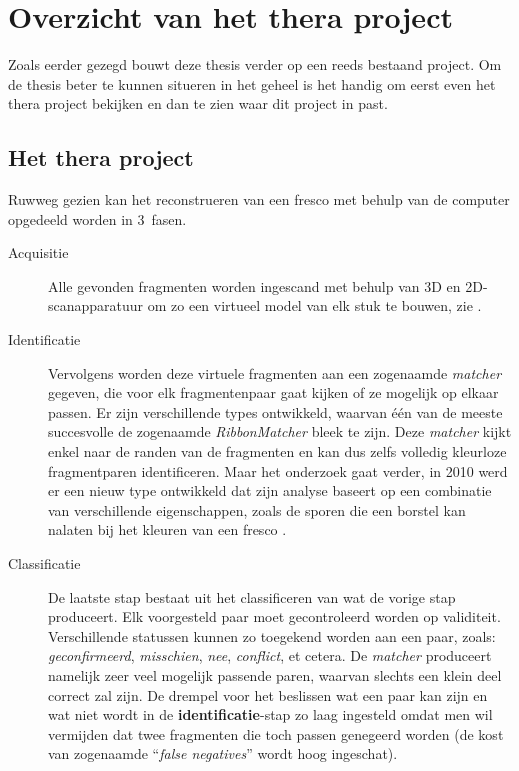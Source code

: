 \chapter{Overzicht van het thera project}
\label{hoofdstuk:overzicht}
Zoals eerder gezegd bouwt deze thesis verder op een reeds bestaand project. Om de thesis beter te kunnen situeren in het geheel is het handig om eerst even het thera project bekijken
en dan te zien waar dit project in past.

\section{Het thera project}
Ruwweg gezien kan het reconstrueren van een fresco met behulp van de computer opgedeeld worden in 3~fasen.

\begin{description}
	\item[Acquisitie] Alle gevonden fragmenten worden ingescand met behulp van 3D en 2D-scanapparatuur om zo een virtueel model van elk stuk te bouwen, zie \cite{Brown2008}.  
	\item[Identificatie] Vervolgens worden deze virtuele fragmenten aan een zogenaamde \emph{matcher} gegeven, die voor elk fragmentenpaar gaat kijken of ze mogelijk op elkaar passen. Er zijn verschillende types ontwikkeld, waarvan \'e\'en van de meeste succesvolle de zogenaamde \emph{RibbonMatcher} \cite{Brown2008} bleek te zijn. Deze \emph{matcher} kijkt enkel naar de randen van de fragmenten en kan dus zelfs volledig kleurloze fragmentparen identificeren. Maar het onderzoek gaat verder, in 2010 werd er een nieuw type ontwikkeld dat zijn analyse baseert op een combinatie van verschillende eigenschappen, zoals de sporen die een borstel kan nalaten bij het kleuren van een fresco \cite{TolerFranklin2010}.
	\item[Classificatie] De laatste stap bestaat uit het classificeren van wat de vorige stap produceert. Elk voorgesteld paar moet gecontroleerd worden op validiteit. Verschillende statussen kunnen zo toegekend worden aan
	een paar, zoals: \emph{geconfirmeerd}, \emph{misschien}, \emph{nee}, \emph{conflict}, et cetera. De \emph{matcher} produceert namelijk zeer veel mogelijk passende paren, waarvan slechts een klein deel correct zal zijn. De drempel voor het beslissen wat een paar kan zijn en wat niet wordt in de \textbf{identificatie}-stap zo laag ingesteld omdat men wil vermijden dat twee fragmenten die toch passen genegeerd worden (de kost van zogenaamde ``\emph{false negatives}'' wordt hoog ingeschat).
\end{description}

